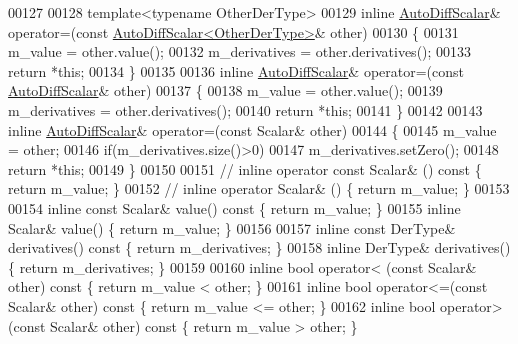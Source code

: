 \begin{DoxyCode}
00127 
00128     \textcolor{keyword}{template}<\textcolor{keyword}{typename} OtherDerType>
00129     \textcolor{keyword}{inline} \hyperlink{class_eigen_1_1_auto_diff_scalar}{AutoDiffScalar}& operator=(\textcolor{keyword}{const} 
      \hyperlink{class_eigen_1_1_auto_diff_scalar}{AutoDiffScalar<OtherDerType>}& other)
00130     \{
00131       m\_value = other.value();
00132       m\_derivatives = other.derivatives();
00133       \textcolor{keywordflow}{return} *\textcolor{keyword}{this};
00134     \}
00135 
00136     \textcolor{keyword}{inline} \hyperlink{class_eigen_1_1_auto_diff_scalar}{AutoDiffScalar}& operator=(\textcolor{keyword}{const} \hyperlink{class_eigen_1_1_auto_diff_scalar}{AutoDiffScalar}& other)
00137     \{
00138       m\_value = other.value();
00139       m\_derivatives = other.derivatives();
00140       \textcolor{keywordflow}{return} *\textcolor{keyword}{this};
00141     \}
00142 
00143     \textcolor{keyword}{inline} \hyperlink{class_eigen_1_1_auto_diff_scalar}{AutoDiffScalar}& operator=(\textcolor{keyword}{const} Scalar& other)
00144     \{
00145       m\_value = other;
00146       \textcolor{keywordflow}{if}(m\_derivatives.size()>0)
00147         m\_derivatives.setZero();
00148       \textcolor{keywordflow}{return} *\textcolor{keyword}{this};
00149     \}
00150 
00151 \textcolor{comment}{//     inline operator const Scalar& () const \{ return m\_value; \}}
00152 \textcolor{comment}{//     inline operator Scalar& () \{ return m\_value; \}}
00153 
00154     \textcolor{keyword}{inline} \textcolor{keyword}{const} Scalar& value()\textcolor{keyword}{ const }\{ \textcolor{keywordflow}{return} m\_value; \}
00155     \textcolor{keyword}{inline} Scalar& value() \{ \textcolor{keywordflow}{return} m\_value; \}
00156 
00157     \textcolor{keyword}{inline} \textcolor{keyword}{const} DerType& derivatives()\textcolor{keyword}{ const }\{ \textcolor{keywordflow}{return} m\_derivatives; \}
00158     \textcolor{keyword}{inline} DerType& derivatives() \{ \textcolor{keywordflow}{return} m\_derivatives; \}
00159 
00160     \textcolor{keyword}{inline} \textcolor{keywordtype}{bool} operator< (\textcolor{keyword}{const} Scalar& other)\textcolor{keyword}{ const  }\{ \textcolor{keywordflow}{return} m\_value <  other; \}
00161     \textcolor{keyword}{inline} \textcolor{keywordtype}{bool} operator<=(\textcolor{keyword}{const} Scalar& other)\textcolor{keyword}{ const  }\{ \textcolor{keywordflow}{return} m\_value <= other; \}
00162     \textcolor{keyword}{inline} \textcolor{keywordtype}{bool} operator> (\textcolor{keyword}{const} Scalar& other)\textcolor{keyword}{ const  }\{ \textcolor{keywordflow}{return} m\_value >  other; \}

\end{DoxyCode}
